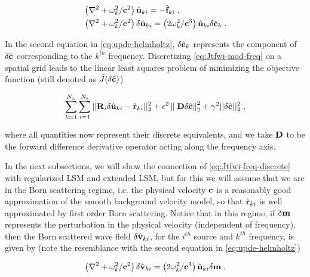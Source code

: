 \vspace*{-0.6cm}
\begin{equation}
\begin{split}
& \left( \mathbf{\nabla}^2 + \omega_k^2 / \mathbf{c}^2 \right) \hat{\mathbf{u}}_{ki} = - \hat{\mathbf{f}}_{ki} \;,\\
& \left( \mathbf{\nabla}^2 + \omega_k^2 / \mathbf{c}^2 \right) \delta \hat{\mathbf{u}}_{ki} = \left( 2 \omega_k^2 / \mathbf{c}^3 \right) \hat{\mathbf{u}}_{ki} \delta \hat{\mathbf{c}}_{k} \;.
\end{split}
\label{eq:upde-helmholtz}
\end{equation}
\vspace*{-0.6cm}

In the second equation in \eqref{eq:upde-helmholtz}, $\delta \hat{\mathbf{c}}_{k}$ represents the component of $\delta \hat{\mathbf{c}}$ corresponding to the $k^{th}$ frequency. Discretizing \eqref{eq:Jtfwi-mod-freq} on a spatial grid leads to the linear least squares problem of minimizing the objective function (still denoted as $\hat{J}(\delta \hat{\mathbf{c}})$)

\vspace*{-0.7cm}
\begin{equation}
\sum_{k=1}^{N_\omega} \sum_{i=1}^{N_s} ||\mathbf{R}_i \delta \hat{\mathbf{u}}_{ki} - \hat{\mathbf{r}}_{ki}||_2^2 + \epsilon^2 \left\lVert\; \mathbf{D} \delta \hat{\mathbf{c}} \right\rVert^2_2 + \gamma^2 ||\delta \hat{\mathbf{c}}||^2_2\;,
\label{eq:Jtfwi-freq-discrete}
\end{equation}
\vspace*{-0.5cm}

where all quantities now represent their discrete equivalents, and we take $\mathbf{D}$ to be the forward difference derivative operator acting along the frequency axis.

In the next subsections, we will show the connection of \eqref{eq:Jtfwi-freq-discrete} with regularized LSM and extended LSM, but for this we will assume that we are in the Born scattering regime, i.e. the physical velocity $\mathbf{c}$ is a reasonably good approximation of the smooth background velocity model, so that $\hat{\mathbf{r}}_{ki}$ is well approximated by first order Born scattering. Notice that in this regime, if $\delta \mathbf{m}$ represents the perturbation in the physical velocity (independent of frequency), then the Born scattered wave field $\delta \hat{\mathbf{v}}_{ki}$, for the $i^{th}$ source and $k^{th}$ frequency, is given by (note the resemblance with the second equation in \eqref{eq:upde-helmholtz})

\vspace*{-0.4cm}
\begin{equation}
\left( \mathbf{\nabla}^2 + \omega_k^2 / \mathbf{c}^2 \right) \delta \hat{\mathbf{v}}_{ki} = \left( 2 \omega_k^2 / \mathbf{c}^3 \right) \hat{\mathbf{u}}_{ki} \delta \mathbf{m} \;.
\label{eq:born-helmholtz}
\end{equation}
\vspace*{-0.5cm}

